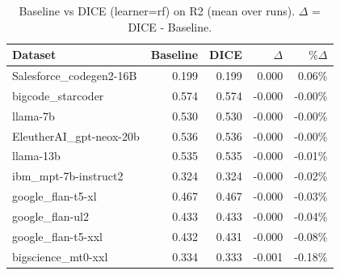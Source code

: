 \begin{table}[t]
\centering
\small
\caption{Baseline vs DICE (learner=rf) on R2 (mean over runs). $\Delta$ = DICE - Baseline.}
\label{tab:baseline-vs-dice-rf-light-R2}
\begin{tabular}{lrrrr}
\toprule
Dataset & Baseline & DICE & $\Delta$ & $\%\Delta$ \\
\midrule
Salesforce\_codegen2-16B & 0.199 & 0.199 & 0.000 & 0.06\% \\
bigcode\_starcoder & 0.574 & 0.574 & -0.000 & -0.00\% \\
llama-7b & 0.530 & 0.530 & -0.000 & -0.00\% \\
EleutherAI\_gpt-neox-20b & 0.536 & 0.536 & -0.000 & -0.00\% \\
llama-13b & 0.535 & 0.535 & -0.000 & -0.01\% \\
ibm\_mpt-7b-instruct2 & 0.324 & 0.324 & -0.000 & -0.02\% \\
google\_flan-t5-xl & 0.467 & 0.467 & -0.000 & -0.03\% \\
google\_flan-ul2 & 0.433 & 0.433 & -0.000 & -0.04\% \\
google\_flan-t5-xxl & 0.432 & 0.431 & -0.000 & -0.08\% \\
bigscience\_mt0-xxl & 0.334 & 0.333 & -0.001 & -0.18\% \\
\bottomrule
\end{tabular}
\end{table}